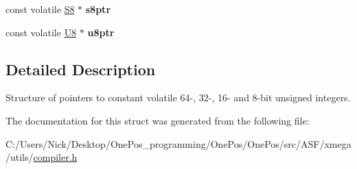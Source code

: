 \begin{DoxyCompactItemize}
\item 
\hypertarget{struct_struct_c_v_ptr_a13457e86fece2ce730defcc94c91e4dc}{const volatile \hyperlink{group__group__xmega__utils_gaf1475a0bb1962ef08dd1f78bd5dba87a}{S8} $\ast$ {\bfseries s8ptr}}\label{struct_struct_c_v_ptr_a13457e86fece2ce730defcc94c91e4dc}

\item 
\hypertarget{struct_struct_c_v_ptr_aa3713e0a7260185261a205f121081aca}{const volatile \hyperlink{group__group__xmega__utils_gaa63ef7b996d5487ce35a5a66601f3e73}{U8} $\ast$ {\bfseries u8ptr}}\label{struct_struct_c_v_ptr_aa3713e0a7260185261a205f121081aca}

\end{DoxyCompactItemize}


\subsection{Detailed Description}
Structure of pointers to constant volatile 64-\/, 32-\/, 16-\/ and 8-\/bit unsigned integers. 

The documentation for this struct was generated from the following file\-:\begin{DoxyCompactItemize}
\item 
C\-:/\-Users/\-Nick/\-Desktop/\-One\-Pos\-\_\-programming/\-One\-Pos/\-One\-Pos/src/\-A\-S\-F/xmega/utils/\hyperlink{compiler_8h}{compiler.\-h}\end{DoxyCompactItemize}
